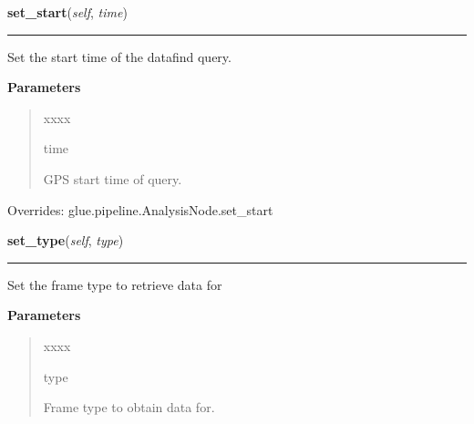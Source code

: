     \label{stochastic:LSCDataFindNode:set_start}
    \vspace{0.5ex}

    \begin{boxedminipage}{\textwidth}

    \raggedright \textbf{set\_start}(\textit{self}, \textit{time})

    \vspace{-1.5ex}

    \rule{\textwidth}{0.5\fboxrule}
    Set the start time of the datafind query.

    \vspace{1ex}

      \textbf{Parameters}
      \begin{quote}
        \begin{Ventry}{xxxx}

          \item[time]

          GPS start time of query.

        \end{Ventry}

      \end{quote}

    \vspace{1ex}

      Overrides: glue.pipeline.AnalysisNode.set\_start

    \end{boxedminipage}

    \label{stochastic:LSCDataFindNode:set_type}
    \vspace{0.5ex}

    \begin{boxedminipage}{\textwidth}

    \raggedright \textbf{set\_type}(\textit{self}, \textit{type})

    \vspace{-1.5ex}

    \rule{\textwidth}{0.5\fboxrule}
    Set the frame type to retrieve data for

    \vspace{1ex}

      \textbf{Parameters}
      \begin{quote}
        \begin{Ventry}{xxxx}

          \item[type]

          Frame type to obtain data for.

        \end{Ventry}

      \end{quote}

    \vspace{1ex}

    \end{boxedminipage}

